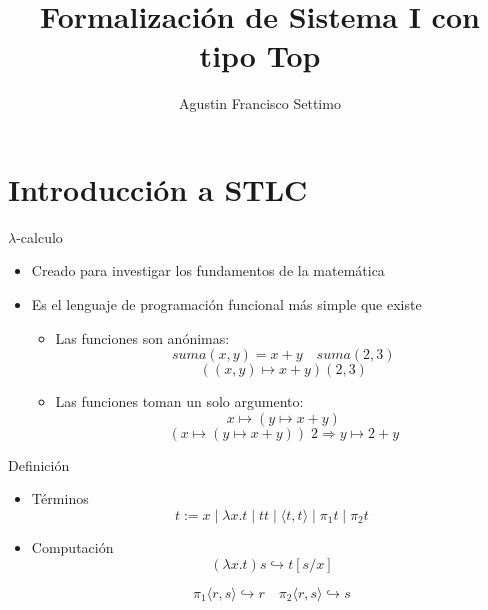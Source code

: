 \documentclass[aspectratio=149]{beamer}
\title{Formalización de Sistema I con tipo Top}
\author{Agustin Francisco Settimo}
\date{}
\begin{document}
	
\begin{frame}[plain]
    \maketitle
\end{frame}

\section{Introducción a STLC}

\begin{frame}{$\lambda$-calculo}
	\begin{itemize}[<+->]
		\item Creado para investigar los fundamentos de la matemática
		\item Es el lenguaje de programación funcional más simple que existe
			\begin{itemize}[<+->]
				\item Las funciones son anónimas:
				\[ suma(x, y)= x + y \quad suma(2, 3) \]
				\[ ((x, y) \mapsto x + y)(2, 3) \]
				
				\item Las funciones toman un solo argumento:
				\[ x \mapsto (y \mapsto x + y) \]
				\[ (x \mapsto (y \mapsto x + y))\; 2 \Rightarrow y \mapsto 2 + y \]
			\end{itemize}
	\end{itemize}
\end{frame}

\begin{frame}{Definición}
	\begin{itemize}[<+->]
		\item Términos
			\[ t := x \mid \lambda x.t \mid t t \mid \langle t, t \rangle \mid \pi_1 t \mid \pi_2 t \]
		
		\item Computación
			\[ (\lambda x.t) s \hookrightarrow t[s/x] \]

			\[ \pi_1 \langle r, s \rangle \hookrightarrow r \quad \pi_2 \langle r, s \rangle \hookrightarrow s \]
	\end{itemize}
	
\end{frame}
\end{document}
